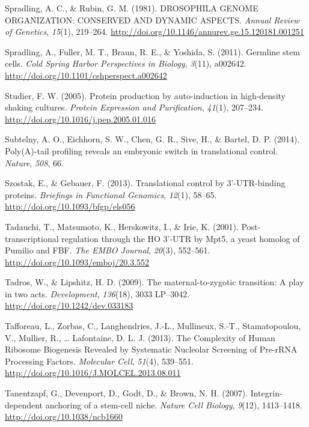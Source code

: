 \documentclass[12pt,oneside]{reedthesis}
\newlength{\cslhangindent}
\newenvironment{cslreferences}%
  {\setlength{\parindent}{0pt}%
  \everypar{\setlength{\hangindent}{\cslhangindent}}\ignorespaces}%
  {\par}
\begin{document}
\begin{cslreferences}
\leavevmode\hypertarget{ref-Spradling1981b}{}%
Spradling, A. C., \& Rubin, G. M. (1981). DROSOPHILA GENOME ORGANIZATION: CONSERVED AND DYNAMIC ASPECTS. \emph{Annual Review of Genetics}, \emph{15}(1), 219--264. \url{http://doi.org/10.1146/annurev.ge.15.120181.001251}

\leavevmode\hypertarget{ref-Spradling2011f}{}%
Spradling, A., Fuller, M. T., Braun, R. E., \& Yoshida, S. (2011). Germline stem cells. \emph{Cold Spring Harbor Perspectives in Biology}, \emph{3}(11), a002642. \url{http://doi.org/10.1101/cshperspect.a002642}

\leavevmode\hypertarget{ref-studierProteinProductionAutoinduction2005}{}%
Studier, F. W. (2005). Protein production by auto-induction in high-density shaking cultures. \emph{Protein Expression and Purification}, \emph{41}(1), 207--234. \url{http://doi.org/10.1016/j.pep.2005.01.016}

\leavevmode\hypertarget{ref-Subtelny2014a}{}%
Subtelny, A. O., Eichhorn, S. W., Chen, G. R., Sive, H., \& Bartel, D. P. (2014). Poly(A)-tail profiling reveals an embryonic switch in translational control. \emph{Nature}, \emph{508}, 66.

\leavevmode\hypertarget{ref-Szostak2013l}{}%
Szostak, E., \& Gebauer, F. (2013). Translational control by 3'-UTR-binding proteins. \emph{Briefings in Functional Genomics}, \emph{12}(1), 58--65. \url{http://doi.org/10.1093/bfgp/els056}

\leavevmode\hypertarget{ref-Tadauchi2001a}{}%
Tadauchi, T., Matsumoto, K., Herskowitz, I., \& Irie, K. (2001). Post-transcriptional regulation through the HO 3'-UTR by Mpt5, a yeast homolog of Pumilio and FBF. \emph{The EMBO Journal}, \emph{20}(3), 552--561. \url{http://doi.org/10.1093/emboj/20.3.552}

\leavevmode\hypertarget{ref-Tadros2009c}{}%
Tadros, W., \& Lipshitz, H. D. (2009). The maternal-to-zygotic transition: A play in two acts. \emph{Development}, \emph{136}(18), 3033 LP--3042. \url{http://doi.org/10.1242/dev.033183}

\leavevmode\hypertarget{ref-Tafforeau2013a}{}%
Tafforeau, L., Zorbas, C., Langhendries, J.-L., Mullineux, S.-T., Stamatopoulou, V., Mullier, R., \ldots{} Lafontaine, D. L. J. (2013). The Complexity of Human Ribosome Biogenesis Revealed by Systematic Nucleolar Screening of Pre-rRNA Processing Factors. \emph{Molecular Cell}, \emph{51}(4), 539--551. \url{http://doi.org/10.1016/J.MOLCEL.2013.08.011}

\leavevmode\hypertarget{ref-tanentzapfIntegrindependentAnchoringStemcell2007}{}%
Tanentzapf, G., Devenport, D., Godt, D., \& Brown, N. H. (2007). Integrin-dependent anchoring of a stem-cell niche. \emph{Nature Cell Biology}, \emph{9}(12), 1413--1418. \url{http://doi.org/10.1038/ncb1660}


\end{cslreferences}
\end{document}
